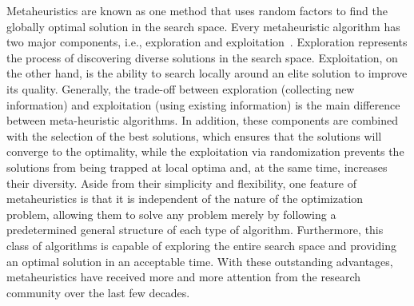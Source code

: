 Metaheuristics are known as one method that uses random factors to find the globally optimal solution in the search space. Every metaheuristic algorithm has two major components, i.e., exploration and exploitation~\cite{yang2010nature}. Exploration represents the process of discovering diverse solutions in the search space. Exploitation, on the other hand, is the ability to search locally around an elite solution to improve its quality. Generally, the trade-off between exploration (collecting new information) and exploitation (using existing information) is the main difference between meta-heuristic algorithms. In addition, these components are combined with the selection of the best solutions, which ensures that the solutions will converge to the optimality, while the exploitation via randomization prevents the solutions from being trapped at local optima and, at the same time, increases their diversity. Aside from their simplicity and flexibility, one feature of metaheuristics is that it is independent of the nature of the optimization problem, allowing them to solve any problem merely by following a predetermined general structure of each type of algorithm. Furthermore, this class of algorithms is capable of exploring the entire search space and providing an optimal solution in an acceptable time. With these outstanding advantages, metaheuristics have received more and more attention from the research community over the last few decades.

